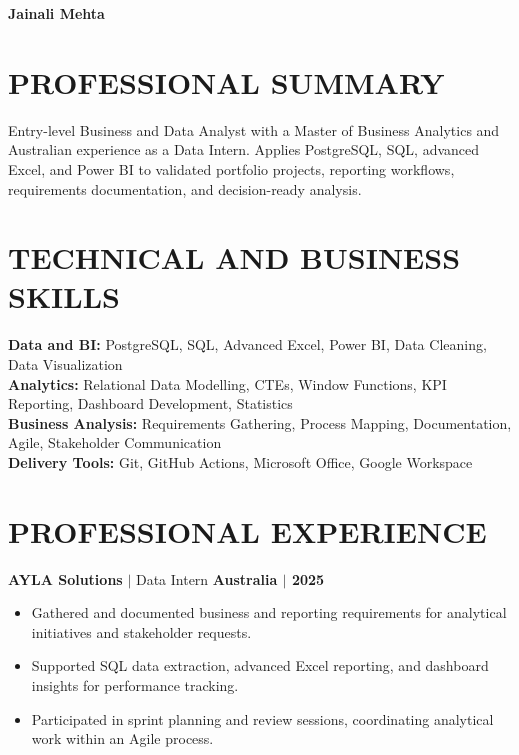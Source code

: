 \documentclass[letterpaper,10pt]{article}
\newcommand{\role}[4]{\textbf{#1} $\vert$ #2 \hfill \textbf{#3 $\vert$ #4}\par\vspace{-1pt}}
\begin{document}
\fontsize{10.1}{11.7}\selectfont

\begin{center}
  {\fontsize{21}{23}\selectfont\bfseries\color{navy} Jainali Mehta}\par
  \par
\end{center}
\vspace{-6pt}

\section*{PROFESSIONAL SUMMARY}
Entry-level Business and Data Analyst with a Master of Business Analytics and Australian experience as a Data Intern. Applies PostgreSQL, SQL, advanced Excel, and Power BI to validated portfolio projects, reporting workflows, requirements documentation, and decision-ready analysis.

\section*{TECHNICAL AND BUSINESS SKILLS}
\textbf{Data and BI:} PostgreSQL, SQL, Advanced Excel, Power BI, Data Cleaning, Data Visualization\\
\textbf{Analytics:} Relational Data Modelling, CTEs, Window Functions, KPI Reporting, Dashboard Development, Statistics\\
\textbf{Business Analysis:} Requirements Gathering, Process Mapping, Documentation, Agile, Stakeholder Communication\\
\textbf{Delivery Tools:} Git, GitHub Actions, Microsoft Office, Google Workspace

\section*{PROFESSIONAL EXPERIENCE}
\role{AYLA Solutions}{Data Intern}{Australia}{2025}
\begin{itemize}
  \item Gathered and documented business and reporting requirements for analytical initiatives and stakeholder requests.
  \item Supported SQL data extraction, advanced Excel reporting, and dashboard insights for performance tracking.
  \item Participated in sprint planning and review sessions, coordinating analytical work within an Agile process.
\end{itemize}
\end{document}
